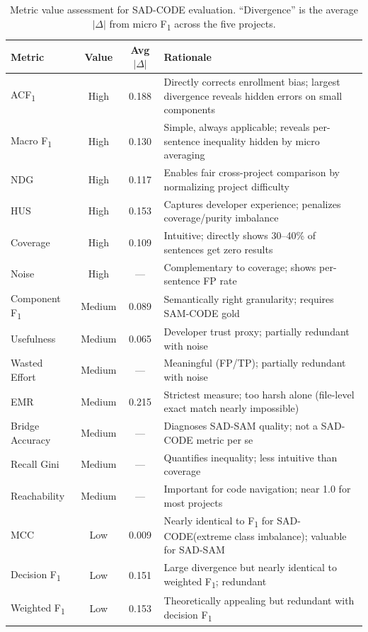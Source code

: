 \documentclass[11pt,a4paper]{report}
\newcommand{\sadcode}{SAD-CODE\xspace}
\newcommand{\sadsam}{SAD-SAM\xspace}
\newcommand{\samcode}{SAM-CODE\xspace}
\newcommand{\fone}{F\textsubscript{1}\xspace}
\newcommand{\acfone}{ACF\textsubscript{1}\xspace}
\begin{document}
\begin{table}[h]
\caption{Metric value assessment for \sadcode evaluation. ``Divergence'' is the
average $|\Delta|$ from micro \fone across the five projects.}
\label{tab:assessment}
\centering\small
\begin{tabular}{lccp{5.5cm}}
\toprule
\textbf{Metric} & \textbf{Value} & \textbf{Avg $|\Delta|$} & \textbf{Rationale} \\
\midrule
\acfone & High & 0.188 & Directly corrects enrollment bias; largest divergence reveals hidden errors on small components \\
Macro \fone & High & 0.130 & Simple, always applicable; reveals per-sentence inequality hidden by micro averaging \\
NDG & High & 0.117 & Enables fair cross-project comparison by normalizing project difficulty \\
HUS & High & 0.153 & Captures developer experience; penalizes coverage/purity imbalance \\
Coverage & High & 0.109 & Intuitive; directly shows 30--40\% of sentences get zero results \\
Noise & High & --- & Complementary to coverage; shows per-sentence FP rate \\
\midrule
Component \fone & Medium & 0.089 & Semantically right granularity; requires \samcode gold \\
Usefulness & Medium & 0.065 & Developer trust proxy; partially redundant with noise \\
Wasted Effort & Medium & --- & Meaningful (FP/TP); partially redundant with noise \\
EMR & Medium & 0.215 & Strictest measure; too harsh alone (file-level exact match nearly impossible) \\
Bridge Accuracy & Medium & --- & Diagnoses \sadsam quality; not a \sadcode metric per se \\
Recall Gini & Medium & --- & Quantifies inequality; less intuitive than coverage \\
Reachability & Medium & --- & Important for code navigation; near 1.0 for most projects \\
\midrule
MCC & Low & 0.009 & Nearly identical to \fone for \sadcode (extreme class imbalance); valuable for \sadsam \\
Decision \fone & Low & 0.151 & Large divergence but nearly identical to weighted \fone; redundant \\
Weighted \fone & Low & 0.153 & Theoretically appealing but redundant with decision \fone \\

\end{tabular}
\end{table}
\end{document}
